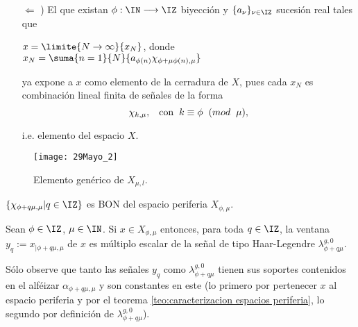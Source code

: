 \begin{dem}
\begin{itemize}
\item[$\Leftarrow$ )] El que existan 
$\phi : \IN \longrightarrow \IZ $ biyección y
$\{ a_{\nu} \}_{\nu \in \IZ}$ sucesión real tales que
\begin{center}
$x= \limite{N \rightarrow \infty }{ x_{N} }$,
donde $x_{N}= \suma{n=1}{N}{a_{\phi(n)}\chi_{\phi + \mu \phi(n),\mu }}$
\end{center}

ya expone a $x$ como elemento de la cerradura de $X$,
pues cada $x_{N}$ es combinación lineal finita de señales
de la forma
\[
\chi_{k, \mu},\hspace{0.3cm} \text{con} \hspace{0.2cm} 
k \equiv \phi \hspace{0.2cm} (mod \hspace{0.2cm} \mu),
\]

i.e. elemento del espacio $X$.
\end{itemize}
\QEDB
\end{dem}



\begin{figure}[H]
	\centering
	\texttt{[image: 29Mayo\_2]}
	\caption{Elemento genérico de $X_{\mu , l}$.
	}
\end{figure}

\begin{obs} \label{prop: BON para espacios periferia}
$\{ \chi_{\phi + q \mu, \mu} | q \in \IZ\}$
es BON del espacio periferia $X_{\phi, \mu}$.
\end{obs}



\begin{prop} \label{prop: ventanas son constantes a la primera de Haar-Legendre}
Sean $\phi \in \IZ$, $\mu \in \IN$.
Si $x \in X_{\phi, \mu}$ entonces, para toda $q \in \IZ$,
la ventana $y_{q}:= x_{|\phi+q\mu, \mu}$ 
de $x$ es múltiplo
escalar
de la señal 
de tipo Haar-Legendre $\lambda_{\phi+q\mu}^{g,0}$.
\end{prop}
\begin{dem}
Sólo observe que tanto las señales
$y_{q}$ como $\lambda_{\phi+q\mu}^{g,0}$
tienen sus soportes contenidos en 
el alféizar
$\alpha_{\phi+q\mu, \mu}$ 
y son constantes en este (lo primero
por pertenecer $x$ al espacio periferia y por
el teorema 
\ref{teo:caracterizacion espacios periferia}, 
lo segundo por definición de
$\lambda_{\phi+q\mu}^{g,0}$).
\QEDB
\end{dem}

